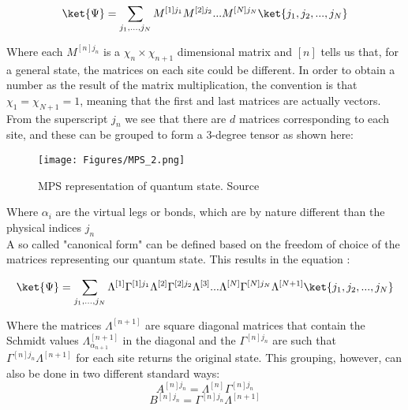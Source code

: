 \begin{equation}
    \ket{\Psi} = \sum_{j_1,...,j_N} M^{[1]j_1} M^{[2]j_2} ... M^{[N]j_N} \ket{j_1,j_2,...,j_N}
    \label{eq:MPS_1}
\end{equation}

Where each $ M^{[n]j_n}$ is a $\chi_n \times \chi_{n+1}$ dimensional matrix and $[n]$ tells us that, for a general state, the matrices on each site could be different.
In order to obtain a number as the result of the matrix multiplication, the convention is that $\chi_1 = \chi_{N+1} = 1$, meaning that the first and last matrices are actually vectors.\\

From the superscript $j_n$ we see that there are $d$ matrices corresponding to each site, and these can be grouped to form a 3-degree tensor as shown here:

\begin{figure}[h!]
    \centering
    \texttt{[image: Figures/MPS\_2.png]}
    \caption{MPS representation of quantum state. Source \cite{anleitung}}
    \label{fig:mps-2}
\end{figure}

Where $\alpha_i$ are the virtual legs or bonds, which are by nature different than the physical indices $j_n$\\

A so called "canonical form" can be defined based on the freedom of choice of the matrices representing our quantum state. This results in the equation \cite{anleitung}:

\begin{equation}
    \ket{\Psi} = \sum_{j_1,...,j_N} \Lambda^{[1]} \Gamma^{[1]j_1}\Lambda^{[2]} \Gamma^{[2]j_2}\Lambda^{[3]}...\Lambda^{[N]} \Gamma^{[N]j_N} \Lambda^{[N+1]} \ket{j_1,j_2,...,j_N}
    \label{eq:mps-canonical}
\end{equation}

Where the matrices $\Lambda^{[n+1]}$ are square diagonal matrices that contain the Schmidt values $\Lambda^{[n+1]}_{\alpha_{n+1}}$ in the diagonal and the $\Gamma^{[n]j_n}$ are such that $\Gamma^{[n]j_n}\Lambda^{[n+1]}$ for each site returns the original state.
This grouping, however, can also be done in two different standard ways:
\begin{equation}
    A^{[n]j_n} = \Lambda^{[n]} \Gamma^{[n]j_n}
    \label{eq:mps-left-canonical}
\end{equation}
\begin{equation}
    B^{[n]j_n} = \Gamma^{[n]j_n}\Lambda^{[n+1]}
    \label{eq:mps-right-canonical}
\end{equation}

